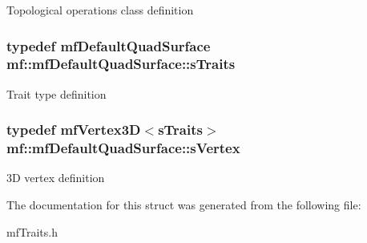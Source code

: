 Topological operations class definition \hypertarget{structmf_1_1mfDefaultQuadSurface_ae66261c5d476e4f08c76bd95613146f8}{
\subsubsection[{sTraits}]{\setlength{\rightskip}{0pt plus 5cm}typedef {\bf mfDefaultQuadSurface} {\bf mf::mfDefaultQuadSurface::sTraits}}}
\label{structmf_1_1mfDefaultQuadSurface_ae66261c5d476e4f08c76bd95613146f8}
Trait type definition \hypertarget{structmf_1_1mfDefaultQuadSurface_a13e7f334dafe64651870e1a03b746038}{
\subsubsection[{sVertex}]{\setlength{\rightskip}{0pt plus 5cm}typedef {\bf mfVertex3D}$<${\bf sTraits}$>$ {\bf mf::mfDefaultQuadSurface::sVertex}}}
\label{structmf_1_1mfDefaultQuadSurface_a13e7f334dafe64651870e1a03b746038}
3D vertex definition 

The documentation for this struct was generated from the following file:\begin{DoxyCompactItemize}
\item 
mfTraits.h\end{DoxyCompactItemize}
